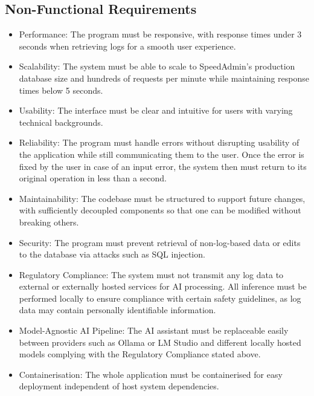 \subsection{Non-Functional Requirements}
\begin{itemize}
    \item Performance: The program must be responsive, with response times under 3 seconds when retrieving logs for a smooth user experience.
    \item Scalability: The system must be able to scale to SpeedAdmin’s production database size and hundreds of requests per minute while maintaining response times below 5 seconds.
    \item Usability: The interface must be clear and intuitive for users with varying technical backgrounds.
    \item Reliability: The program must handle errors without disrupting usability of the application while still communicating them to the user. Once the error is fixed by the user in case of an input error, the system then must return to its original operation in less than a second.
    \item Maintainability: The codebase must be structured to support future changes, with sufficiently decoupled components so that one can be modified without breaking others.
    \item Security: The program must prevent retrieval of non-log-based data or edits to the database via attacks such as SQL injection.
    \item Regulatory Compliance: The system must not transmit any log data to external or externally hosted services for AI processing. All inference must be performed locally to ensure compliance with certain safety guidelines, as log data may contain personally identifiable information.
    \item Model-Agnostic AI Pipeline: The AI assistant must be replaceable easily between providers such as Ollama or LM Studio and different locally hosted models complying with the Regulatory Compliance stated above.
    \item Containerisation: The whole application must be containerised for easy deployment independent of host system dependencies.
\end{itemize}
\pagebreak
